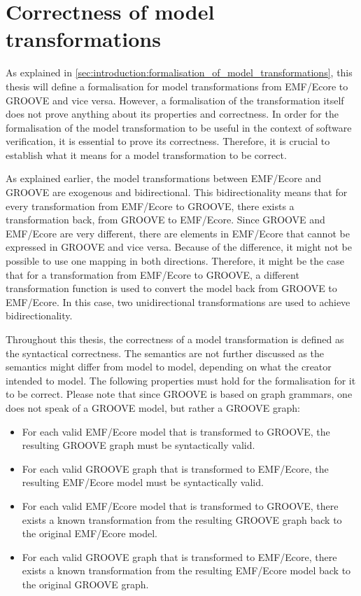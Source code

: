 \section{Correctness of model transformations}
\label{sec:introduction:correctness_of_model_transformations}

As explained in \cref{sec:introduction:formalisation_of_model_transformations}, this thesis will define a formalisation for model transformations from EMF/Ecore to GROOVE and vice versa. However, a formalisation of the transformation itself does not prove anything about its properties and correctness. In order for the formalisation of the model transformation to be useful in the context of software verification, it is essential to prove its correctness. Therefore, it is crucial to establish what it means for a model transformation to be correct.

As explained earlier, the model transformations between EMF/Ecore and GROOVE are exogenous and bidirectional. This bidirectionality means that for every transformation from EMF/Ecore to GROOVE, there exists a transformation back, from GROOVE to EMF/Ecore. Since GROOVE and EMF/Ecore are very different, there are elements in EMF/Ecore that cannot be expressed in GROOVE and vice versa. Because of the difference, it might not be possible to use one mapping in both directions. Therefore, it might be the case that for a transformation from EMF/Ecore to GROOVE, a different transformation function is used to convert the model back from GROOVE to EMF/Ecore. In this case, two unidirectional transformations are used to achieve bidirectionality.

Throughout this thesis, the correctness of a model transformation is defined as the syntactical correctness. The semantics are not further discussed as the semantics might differ from model to model, depending on what the creator intended to model. The following properties must hold for the formalisation for it to be correct. Please note that since GROOVE is based on graph grammars, one does not speak of a GROOVE model, but rather a GROOVE graph:
\begin{itemize}
    \item For each valid EMF/Ecore model that is transformed to GROOVE, the resulting GROOVE graph must be syntactically valid.
    \item For each valid GROOVE graph that is transformed to EMF/Ecore, the resulting EMF/Ecore model must be syntactically valid.
    \item For each valid EMF/Ecore model that is transformed to GROOVE, there exists a known transformation from the resulting GROOVE graph back to the original EMF/Ecore model.
    \item For each valid GROOVE graph that is transformed to EMF/Ecore, there exists a known transformation from the resulting EMF/Ecore model back to the original GROOVE graph.
\end{itemize}

